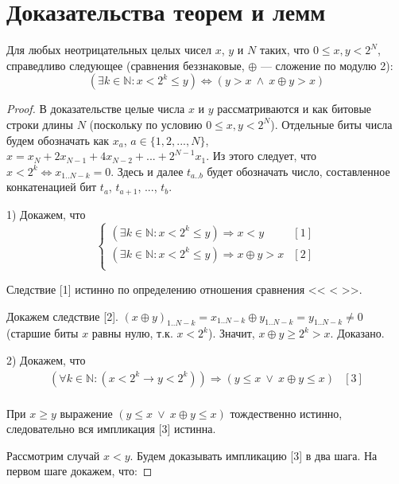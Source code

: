 \chapter{Доказательства теорем и лемм}\label{sec:proofs}

\begin{lemma}\label{QuantorElimination}
Для любых неотрицательных целых чисел $x$, $y$ и $N$ таких, что $0 \leqslant x, y < 2^N$, справедливо следующее (сравнения беззнаковые, $\oplus$ --- сложение по модулю 2):
$$( \exists k \in \mathbb{N} : x < 2^k \leqslant y ) \Leftrightarrow (y > x ~\wedge~ x \oplus y > x)$$
\end{lemma}
\begin{proof}
В доказательстве целые числа $x$ и $y$ рассматриваются и как битовые строки длины $N$ (поскольку по условию $0 \leqslant x, y < 2^N$). Отдельные биты числа будем обозначать как $x_a$, $a \in \{1, 2, ..., N\}$, $x = x_N + 2x_{N-1} + 4x_{N-2} + ... + 2^{N-1} x_1$. Из этого следует, что $x < 2^k \Leftrightarrow x_{1 .. N-k} = 0$. Здесь и далее $t_{a..b}$ будет обозначать число, составленное конкатенацией бит $t_a$, $t_{a+1}$, ..., $t_b$.

1) Докажем, что
$$\left\{\begin{array}{lc}
( \exists k \in \mathbb{N} : x < 2^k \leqslant y ) \Rightarrow x < y & [1]\\
( \exists k \in \mathbb{N} : x < 2^k \leqslant y ) \Rightarrow  x \oplus y > x & [2]\\
\end{array}\right.$$

Следствие [1] истинно по определению отношения сравнения << < >>.

Докажем следствие [2]. $(x \oplus y)_{1..N-k} = x_{1..N-k} \oplus y_{1..N-k} = y_{1..N-k} \neq 0$ (старшие биты $x$ равны нулю, т.к. $x < 2^k$). Значит, $x \oplus y \geqslant 2^k > x$. Доказано.

2) Докажем, что
$$\begin{array}{lc}
( \forall k \in \mathbb{N} : (x < 2^k \rightarrow y < 2^k )) \Rightarrow (y \leqslant x ~\vee~ x \oplus y \leqslant x) & [3]\\
\end{array}$$

При $x \geqslant y$ выражение $(y \leqslant x ~\vee~ x \oplus y \leqslant x)$ тождественно истинно, следовательно вся импликация [3] истинна.

Рассмотрим случай $x < y$. Будем доказывать импликацию [3] в два шага. На первом шаге докажем, что:


\end{proof}
